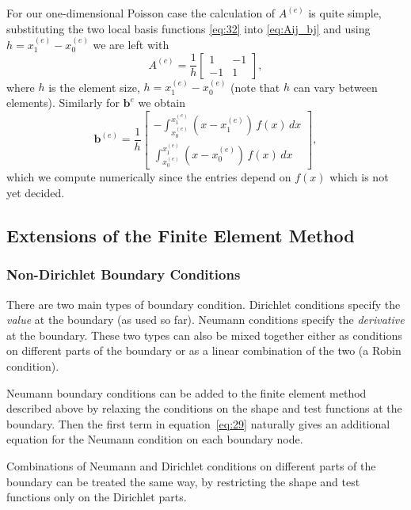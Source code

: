 For our one-dimensional Poisson case the calculation of $A^{(e)}$ is quite
simple, substituting the two local basis functions \eqref{eq:32} into
\eqref{eq:Aij_bj} and using $h=x_{1}^{(e)}-x_{0}^{(e)}$ we are left with
\begin{equation*}
  A^{(e)} = \dfrac{1}{h}
  \left[
    \begin{array}{cc}
      1 & -1 \\ -1 & 1
    \end{array}
  \right],
\end{equation*}
where $h$ is the element size, $h = x_{1}^{(e)}-x_{0}^{(e)}$ (note that $h$ can
vary between elements). Similarly for $\mathbf{b}^{{e}}$ we obtain
\begin{equation*}
  \mathbf{b}^{(e)}=\dfrac{1}{h}\left[
    \begin{array}{c}
      -\int_{x_{0}^{(e)}}^{x_{1}^{(e)}}(x-x_{1}^{(e)})\, f(x)\, dx\\
      \int_{x_{0}^{(e)}}^{x_{1}^{(e)}}(x-x_{0}^{(e)})\, f(x)\, dx
    \end{array}\right],
\end{equation*}
which we compute numerically since the entries depend on $f(x)$ which is not yet
decided.


\subsection{Extensions of the Finite Element Method}

\subsubsection{Non-Dirichlet Boundary Conditions}
\label{sub:Non-Dirichlet-Boundary-Conditions}

There are two main types of boundary condition. Dirichlet conditions specify the
\emph{value} at the boundary (as used so far). Neumann conditions specify the
\emph{derivative} at the boundary. These two types can also be mixed together
either as conditions on different parts of the boundary or as a linear
combination of the two (a Robin condition).

Neumann boundary conditions can be added to the finite element method described
above by relaxing the conditions on the shape and test functions at the
boundary. Then the first term in equation~\eqref{eq:29} naturally gives an
additional equation for the Neumann condition on each boundary node.

Combinations of Neumann and Dirichlet conditions on different parts of the boundary can be treated the same way, by restricting the shape and test functions only on the Dirichlet parts.


